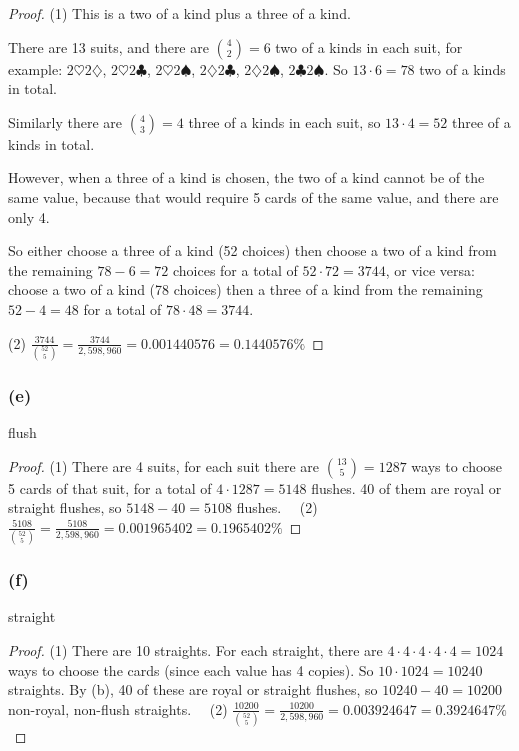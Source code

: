 \documentclass[14pt]{extarticle}
\begin{document}
\begin{proof}
     (1) This is a two of a kind plus a three of a kind.

     There are 13 suits, and there are \(\binom{4}{2} = 6\) two of a kinds in each suit, for example:
     \(2\heartsuit 2\diamondsuit\), \(2\heartsuit 2\clubsuit\), \(2\heartsuit 2\spadesuit\), \(2\diamondsuit 2\clubsuit\),
     \(2\diamondsuit 2\spadesuit\), \(2\clubsuit 2\spadesuit\). So \(13 \cdot 6 = 78\) two of a kinds in total.

     Similarly there are \(\binom{4}{3} = 4\) three of a kinds in each suit, so \(13 \cdot 4 = 52\) three of a kinds in total.

     However, when a three of a kind is chosen, the two of a kind cannot be of the same value, because that would require 5
     cards of the same value, and there are only 4.

     So either choose a three of a kind (52 choices) then choose a two of a kind from the remaining \(78-6=72\) choices for a
     total of \(52 \cdot 72 = 3744\), or vice versa: choose a two of a kind (78 choices) then a three of a kind from the
     remaining \(52-4=48\) for a total of \(78 \cdot 48 = 3744\).

     (2) \(\frac{3744}{\binom{52}{5}} = \frac{3744}{2,598,960} = 0.001440576 = 0.1440576\%\)
\end{proof}

\subsubsection{(e)}
flush

\begin{proof}
     (1) There are 4 suits, for each suit there are \(\binom{13}{5} = 1287\) ways to choose 5 cards of that suit, for a total of
     \(4 \cdot 1287 = 5148\) flushes. 40 of them are royal or straight flushes, so \(5148-40 = 5108\) flushes. \,\,\,\,
     (2) \(\frac{5108}{\binom{52}{5}} = \frac{5108}{2,598,960} = 0.001965402 = 0.1965402\%\)
\end{proof}

\subsubsection{(f)}
straight

\begin{proof}
     (1) There are 10 straights. For each straight, there are \(4 \cdot 4 \cdot 4 \cdot 4 \cdot 4 = 1024\) ways to choose the
     cards (since each value has 4 copies). So \(10 \cdot 1024 = 10240\) straights. By (b), 40 of these are royal or straight
     flushes, so \(10240-40 = 10200\) non-royal, non-flush straights. \,\,\,\,
     (2) \(\frac{10200}{\binom{52}{5}} = \frac{10200}{2,598,960} = 0.003924647 = 0.3924647\%\)
\end{proof}
\end{document}

